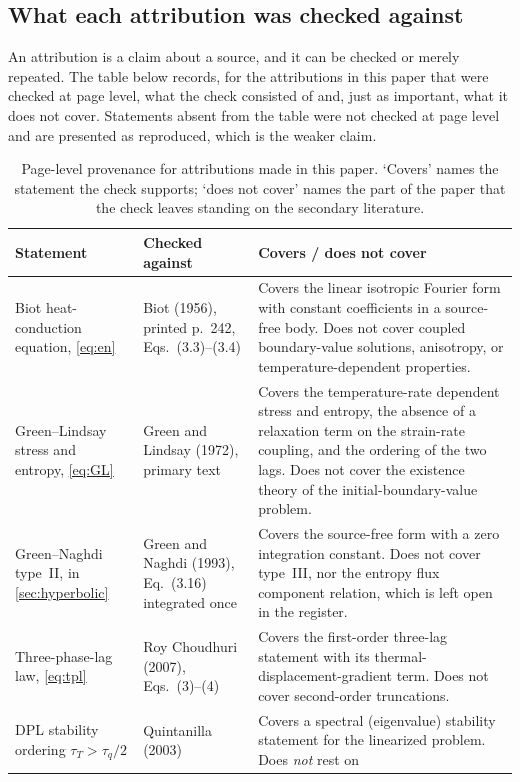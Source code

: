 \subsection{What each attribution was checked against}\label{sec:provenance}

An attribution is a claim about a source, and it can be checked or merely repeated. The table below
records, for the attributions in this paper that were checked at page level, what the check consisted of
and, just as important, what it does not cover. Statements absent from the table were not checked at
page level and are presented as reproduced, which is the weaker claim.

\begin{table}[H]\centering\small
\caption{Page-level provenance for attributions made in this paper. `Covers' names the statement the check
supports; `does not cover' names the part of the paper that the check leaves standing on the secondary
literature.}
\label{tab:provenance}
\begin{tabularx}{\textwidth}{@{}p{3.1cm}Y Y@{}}
\toprule
\textbf{Statement} & \textbf{Checked against} & \textbf{Covers / does not cover} \\
\midrule
Biot heat-conduction equation, \eqref{eq:en} & Biot (1956), printed p.~242, Eqs.~(3.3)--(3.4) &
  Covers the linear isotropic Fourier form with constant coefficients in a source-free body. Does not
  cover coupled boundary-value solutions, anisotropy, or temperature-dependent properties. \\
Green--Lindsay stress and entropy, \eqref{eq:GL} & Green and Lindsay (1972), primary text &
  Covers the temperature-rate dependent stress and entropy, the absence of a relaxation term on the
  strain-rate coupling, and the ordering of the two lags. Does not cover the existence theory of the
  initial-boundary-value problem. \\
Green--Naghdi type~II, in \cref{sec:hyperbolic} & Green and Naghdi (1993), Eq.~(3.16) integrated once &
  Covers the source-free form with a zero integration constant. Does not cover type~III, nor the entropy
  flux component relation, which is left open in the register. \\
Three-phase-lag law, \eqref{eq:tpl} & Roy Choudhuri (2007), Eqs.~(3)--(4) &
  Covers the first-order three-lag statement with its thermal-displacement-gradient term. Does not cover
  second-order truncations. \\
DPL stability ordering $\tau_T>\tau_q/2$ & Quintanilla (2003) &
  Covers a spectral (eigenvalue) stability statement for the linearized problem. Does \emph{not} rest on

\end{tabularx}
\end{table}
